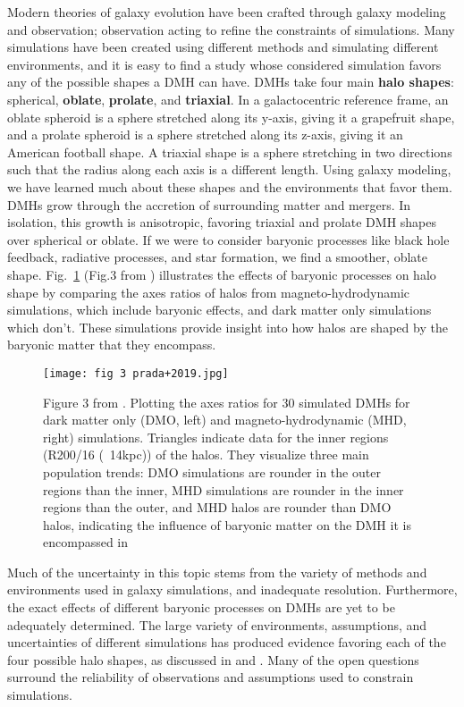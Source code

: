 \documentclass[fleqn,usenatbib]{mnras}
\begin{document}
Modern theories of galaxy evolution have been crafted through galaxy modeling and observation; observation acting to refine the constraints of simulations. Many simulations have been created using different methods and simulating different environments, and it is easy to find a study whose considered simulation favors any of the possible shapes a DMH can have. DMHs take four main \textbf{halo shapes}: spherical, \textbf{oblate}, \textbf{prolate}, and \textbf{triaxial}. In a galactocentric reference frame, an oblate spheroid is a sphere stretched along its y-axis, giving it a grapefruit shape, and a prolate spheroid is a sphere stretched along its z-axis, giving it an American football shape. A triaxial shape is a sphere stretching in two directions such that the radius along each axis is a different length. Using galaxy modeling, we have learned much about these shapes and the environments that favor them. DMHs grow through the accretion of surrounding matter and mergers.  In isolation, this growth is anisotropic, favoring triaxial and prolate DMH shapes over spherical or oblate. If we were to consider baryonic processes like black hole feedback, radiative processes, and star formation, we find a smoother, oblate shape. Fig.~\ref{fig:MHD vs DMO} (Fig.3 from \citet{Prada_2019}) illustrates the effects of baryonic processes on halo shape by comparing the axes ratios of halos from magneto-hydrodynamic simulations, which include baryonic effects, and dark matter only simulations which don't. These simulations provide insight into how halos are shaped by the baryonic matter that they encompass.


\begin{figure}
	\texttt{[image: fig 3 prada+2019.jpg]}
    \caption{Figure 3 from \citet{Prada_2019}. Plotting the axes ratios for 30 simulated DMHs for dark matter only (DMO, left) and magneto-hydrodynamic (MHD, right) simulations. Triangles indicate data for the inner regions (R200/16 (~14kpc)) of the halos. They visualize three main population trends: DMO simulations are rounder in the outer regions than the inner, MHD simulations are rounder in the inner regions than the outer, and MHD halos are rounder than DMO halos, indicating the influence of baryonic matter on the DMH it is encompassed in}
    \label{fig:MHD vs DMO}
\end{figure}

Much of the uncertainty in this topic stems from the variety of methods and environments used in galaxy simulations, and inadequate resolution. Furthermore, the exact effects of different baryonic processes on DMHs are yet to be adequately determined. The large variety of environments, assumptions, and uncertainties of different simulations has produced evidence favoring each of the four possible halo shapes, as discussed in \citet{Chua_2019} and \citet{Prada_2019}. Many of the open questions surround the reliability of observations and assumptions used to constrain simulations.
\end{document}
